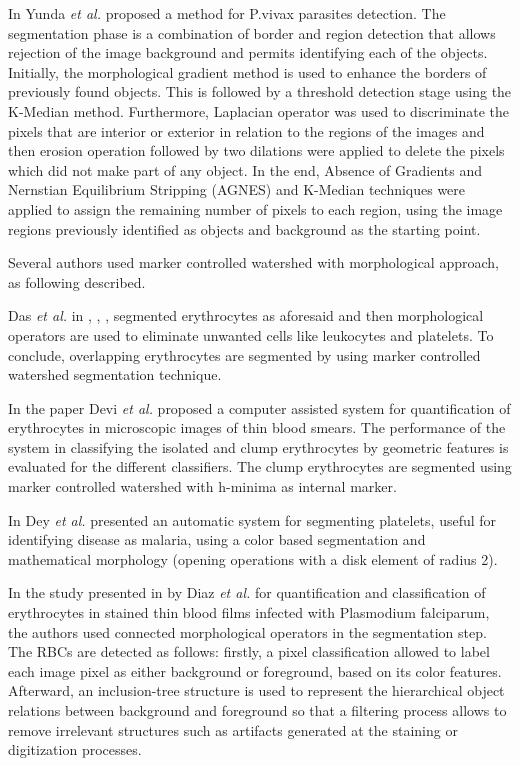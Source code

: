 \documentclass[sensors,review,submit,moreauthors,pdftex,10pt,a4paper]{mdpi}
\begin{document}
In \cite{Yunda2012} Yunda \emph{et al.} proposed a method for P.vivax parasites detection. The segmentation phase is a combination of border and region detection that allows rejection of the image background and permits identifying each of the objects. Initially, the morphological gradient method is used to enhance the borders of previously found objects. This is followed by a threshold detection stage using the K-Median method.
Furthermore, Laplacian operator was used to discriminate the pixels that are interior or exterior in relation to the regions of the images and then erosion operation followed by two dilations were applied to delete the pixels which did not make part of any object. In the end, Absence of Gradients and Nernstian Equilibrium Stripping (AGNES) and K-Median techniques were applied to assign the remaining number of pixels to each region, using the image regions previously identified as objects and background as the starting point.

Several authors used marker controlled watershed \cite{Soille2004} with morphological approach, as following described.

Das \emph{et al.} in \cite{Das2011}, \cite{Das2013}, \cite{Das2014}, \cite{Das2015} segmented erythrocytes as aforesaid and then morphological operators are used to eliminate unwanted cells like leukocytes and platelets. To conclude, overlapping erythrocytes are segmented by using marker controlled watershed segmentation technique.

In the paper \cite{Devi2017} Devi \emph{et al.} proposed a computer assisted system for quantification of erythrocytes in microscopic images of thin blood smears. The performance of the system in classifying the isolated and clump erythrocytes by geometric features is evaluated for the different classifiers. The clump erythrocytes are segmented using marker controlled watershed with h-minima as internal marker.

In \cite{Dey2015} Dey \emph{et al.} presented an automatic system for segmenting platelets, useful for identifying disease as malaria, using a color based segmentation and mathematical morphology (opening operations with a disk element of radius 2).

In the study presented in \cite{Diaz2009} by Diaz \emph{et al.} for quantification and classification of erythrocytes in stained thin blood films infected with Plasmodium falciparum, the authors used connected morphological operators in the segmentation step. The RBCs are detected as follows: firstly, a pixel classification allowed to label each image pixel as either background or foreground, based on its color features. Afterward, an inclusion-tree structure is used to represent the hierarchical object relations between background and foreground so that a filtering process allows to remove irrelevant structures such as artifacts generated at the staining or digitization processes.
\end{document}
